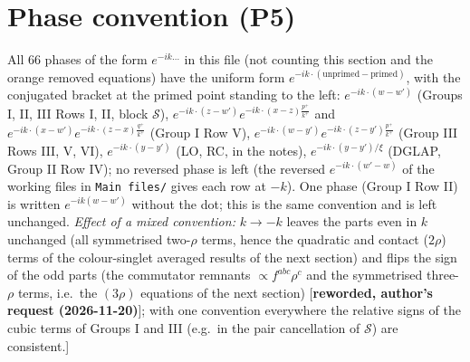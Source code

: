 \documentclass[9pt]{article}
\numberwithin{equation}{section}
\begin{document}
{\color{red}
\section{Phase convention (P5)}
 All 66 phases of the form $e^{-ik\dots}$ in this file (not counting this section and the orange removed equations) have the uniform form $e^{-ik\cdot(\text{unprimed}-\text{primed})}$, with the conjugated bracket at the primed point standing to the left: $e^{-ik\cdot(w-w')}$ (Groups I, II, III Rows I, II, block $\mathcal{S}$), $e^{-ik\cdot(z-w')}e^{-ik\cdot(x-z)\frac{p^{+}}{k^{+}}}$ and $e^{-ik\cdot(x-w')}e^{-ik\cdot(z-x)\frac{q^{+}}{k^{+}}}$ (Group I Row V), $e^{-ik\cdot(w-y')}e^{-ik\cdot(z-y')\frac{p^{+}}{k^{+}}}$ (Group III Rows III, V, VI), $e^{-ik\cdot(y-y')}$ (LO, RC, in the notes), $e^{-ik\cdot(y-y')/\xi}$ (DGLAP, Group II Row IV); no reversed phase is left (the reversed $e^{-ik\cdot(w'-w)}$ of the working files in \texttt{Main files/} gives each row at $-k$). One phase (Group I Row II) is written $e^{-ik(w-w')}$ without the dot; this is the same convention and is left unchanged. \emph{Effect of a mixed convention:} $k\to-k$ leaves the parts even in $k$ unchanged (all symmetrised two-$\rho$ terms, hence the quadratic and contact ($2\rho$) terms of the colour-singlet averaged results of the next section) and flips the sign of the odd parts (the commutator remnants $\propto f^{abc}\rho^{c}$ and the symmetrised three-$\rho$ terms, i.e.\ the $(3\rho)$ equations of the next section) [\textbf{reworded, author's request (2026-11-20)}]; with one convention everywhere the relative signs of the cubic terms of Groups I and III (e.g.\ in the pair cancellation of $\mathcal{S}$) are consistent.]}\par
\end{document}
